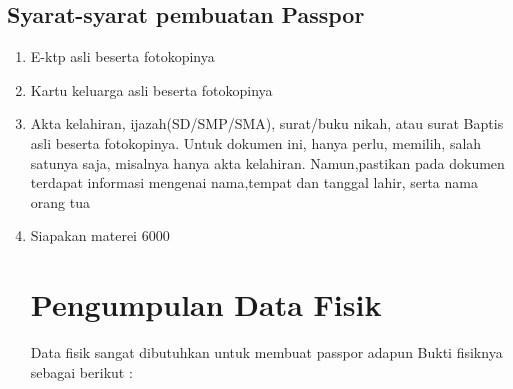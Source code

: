 \subsection{Syarat-syarat pembuatan Passpor}
\begin{enumerate}
\item E-ktp asli beserta fotokopinya
\item Kartu keluarga asli beserta fotokopinya
\item Akta kelahiran, ijazah(SD/SMP/SMA), surat/buku nikah, atau surat Baptis asli beserta fotokopinya. Untuk dokumen ini, hanya perlu, memilih, salah satunya saja, misalnya hanya akta kelahiran. Namun,pastikan pada dokumen terdapat informasi mengenai nama,tempat dan tanggal lahir, serta nama orang tua
\item Siapakan materei 6000

\section{Pengumpulan Data Fisik}
Data fisik sangat dibutuhkan untuk membuat passpor adapun Bukti fisiknya sebagai berikut :  
\end{enumerate}
